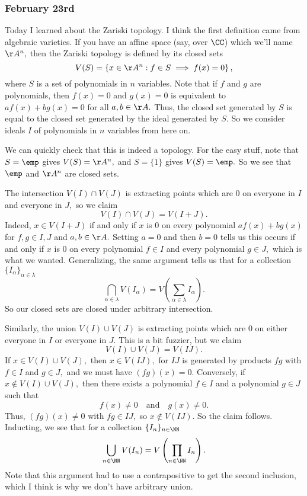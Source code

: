 \subsubsection{February 23rd}
Today I learned about the Zariski topology. I think the first definition came from algebraic varieties. If you have an affine space (say, over $\CC$) which we'll name $\AA^n,$ then the Zariski topology is defined by its closed sets
\[V(S)=\left\{x\in\AA^n:f\in S\implies f(x)=0\right\},\]
where $S$ is a set of polynomials in $n$ variables. Note that if $f$ and $g$ are polynomials, then $f(x)=0$ and $g(x)=0$ is equivalent to $af(x)+bg(x)=0$ for all $a,b\in\AA.$ Thus, the closed set generated by $S$ is equal to the closed set generated by the ideal generated by $S.$ So we consider ideals $I$ of polynomials in $n$ variables from here on.

We can quickly check that this is indeed a topology. For the easy stuff, note that $S=\emp$ gives $V(S)=\AA^n,$ and $S=\{1\}$ gives $V(S)=\emp.$ So we see that $\emp$ and $\AA^n$ are closed sets.

The intersection $V(I)\cap V(J)$ is extracting points which are $0$ on everyone in $I$ and everyone in $J,$ so we claim
\[V(I)\cap V(J)=V(I+J).\]
Indeed, $x\in V(I+J)$ if and only if $x$ is $0$ on every polynomial $af(x)+bg(x)$ for $f,g\in I,J$ and $a,b\in\AA.$ Setting $a=0$ and then $b=0$ tells us this occurs if and only if $x$ is $0$ on every polynomial $f\in I$ and every polynomial $g\in J,$ which is what we wanted. Generalizing, the same argument tells us that for a collection $\{I_\alpha\}_{\alpha\in\lambda}$
\[\bigcap_{\alpha\in\lambda}V(I_\alpha)=V\left(\sum_{\alpha\in\lambda}I_\alpha\right).\]
So our closed sets are closed under arbitrary intersection.

Similarly, the union $V(I)\cup V(J)$ is extracting points which are $0$ on either everyone in $I$ or everyone in $J.$ This is a bit fuzzier, but we claim
\[V(I)\cup V(J)=V(IJ).\]
If $x\in V(I)\cup V(J),$ then $x\in V(IJ),$ for $IJ$ is generated by products $fg$ with $f\in I$ and $g\in J,$ and we must have $(fg)(x)=0.$ Conversely, if $x\not\in V(I)\cup V(J),$ then there exists a polynomial $f\in I$ and a polynomial $g\in J$ such that
\[f(x)\ne0\quad\text{and}\quad g(x)\ne0.\]
Thus, $(fg)(x)\ne0$ with $fg\in IJ,$ so $x\not\in V(IJ).$ So the claim follows. Inducting, we see that for a collection $\{I_n\}_{n\in\NN}$
\[\bigcup_{n\in\NN}V(I_n)=V\left(\prod_{n\in\NN}I_n\right).\]
Note that this argument had to use a contrapositive to get the second inclusion, which I think is why we don't have arbitrary union.

